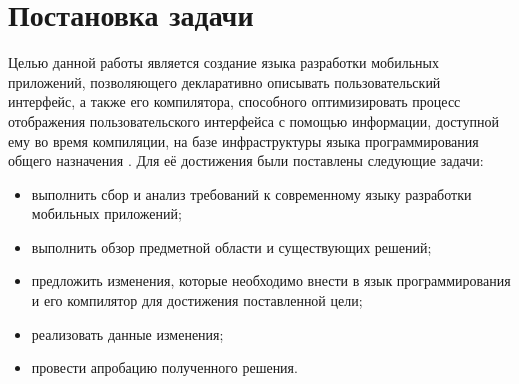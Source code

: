 \section{Постановка задачи}
Целью данной работы является создание языка разработки мобильных
приложений, позволяющего декларативно описывать пользовательский
интерфейс, а также его компилятора, способного оптимизировать
процесс отображения пользовательского интерфейса с помощью информации,
доступной ему во время компиляции, на базе инфраструктуры языка
программирования общего назначения .
Для её достижения были поставлены следующие задачи:
\begin{itemize}
	\item выполнить сбор и анализ требований к современному языку
	разработки мобильных приложений;
	\item выполнить обзор предметной области и существующих решений;
	\item предложить изменения, которые необходимо внести в язык
	программирования  и его компилятор для достижения
	поставленной цели;
	\item реализовать данные изменения;
	\item провести апробацию полученного решения.
\end{itemize}